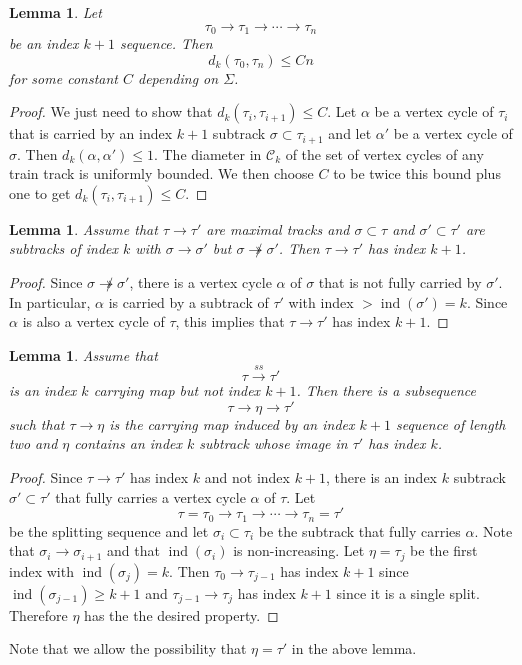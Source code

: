 \documentclass[11pt]{article}
\newtheorem{lemma}[thm]{Lemma}
\theoremstyle{remark}
\def\C{{\mathcal C}}
\def\ind{\operatorname{ind}}
\def\ss{{\overset{ss}\longrightarrow}}
\begin{document}
\begin{lemma}\label{upper bound}
  Let
  $$\tau_0 \to \tau_1 \to \cdots \to \tau_n$$
  be an index $k+1$ sequence. Then
  $$d_{k}(\tau_0, \tau_n) \le Cn$$
  for some constant $C$ depending on $\Sigma$.
\end{lemma}

\begin{proof}
We just need to show that $d_{k}(\tau_i, \tau_{i+1}) \le C$. Let $\alpha$ be a vertex cycle of $\tau_i$ that is carried by an index $k+1$ subtrack $\sigma \subset \tau_{i+1}$ and let $\alpha'$ be a vertex cycle of $\sigma$. Then $d_k(\alpha, \alpha')\leq 1$. The diameter in $\C_k$ of the set of vertex cycles of any train track is uniformly bounded. We then choose $C$ to be twice this bound plus one to get $d_k(\tau_i, \tau_{i+1}) \le C$.
\end{proof}

\begin{lemma}\label{no_double_index}
Assume that $\tau\to \tau'$ are maximal tracks and $\sigma\subset \tau$ and $\sigma' \subset \tau'$ are subtracks of index $k$ with $\sigma \to \sigma'$ but $\sigma\not\twoheadrightarrow\sigma'$. Then $\tau\to \tau'$ has index $k+1$.
\end{lemma}

\begin{proof}
Since $\sigma\not\twoheadrightarrow\sigma'$, there is a vertex cycle $\alpha$ of $\sigma$ that is not fully carried by $\sigma'$. In particular, $\alpha$ is carried by a subtrack of $\tau'$ with index $> \ind(\sigma') = k$. Since $\alpha$ is also a vertex cycle of $\tau$, this implies that $\tau\to\tau'$ has index $k+1$.
\end{proof}

\begin{lemma}\label{full index}
Assume that 
$$\tau\ss \tau'$$
is an index $k$ carrying map but not index $k+1$. Then there is a subsequence
$$\tau\to \eta \to \tau'$$
such that $\tau\to\eta$ is the carrying map induced by
an index $k+1$ sequence of length two and $\eta$ contains an index $k$ subtrack whose image in $\tau'$ has index $k$.
\end{lemma}

\begin{proof}
Since $\tau\to\tau'$ has index $k$ and not index $k+1$, there is an index $k$ subtrack $\sigma' \subset \tau'$ that fully carries a vertex cycle $\alpha$ of $\tau$.
Let
$$\tau= \tau_0 \to \tau_1 \to \cdots \to \tau_n = \tau'$$
be the splitting sequence and let $\sigma_i \subset \tau_i$ be the subtrack that fully carries $\alpha$. Note that $\sigma_i \to \sigma_{i+1}$ and that $\ind(\sigma_i)$ is non-increasing. Let $\eta = \tau_j$ be the first index with $\ind(\sigma_j) = k$. Then $\tau_0 \to \tau_{j-1}$ has index $k+1$ since $\ind(\sigma_{j-1}) \ge k+1$ and $\tau_{j-1}\to \tau_j$ has index $k+1$ since it is a single split. Therefore $\eta$ has the  the desired property.
\end{proof} 
Note that we allow the possibility that $\eta = \tau'$ in the above lemma.
\end{document}
